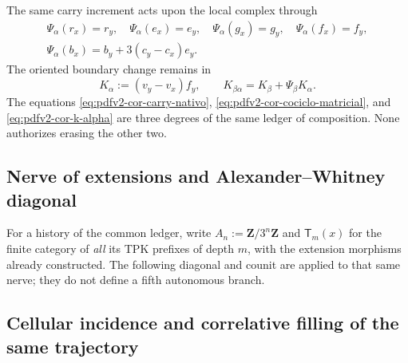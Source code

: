 The same carry increment acts upon the local complex through
\begin{equation}
\label{eq:pdfv2-cor-psi-generadores}
 \begin{gathered}
 \Psi_\alpha(r_x)=r_y,\quad
 \Psi_\alpha(e_x)=e_y,\quad
 \Psi_\alpha(g_x)=g_y,\quad
 \Psi_\alpha(f_x)=f_y,\\
 \Psi_\alpha(b_x)=b_y+3(c_y-c_x)e_y.
 \end{gathered}
\end{equation}
The oriented boundary change remains in
\begin{equation}
\label{eq:pdfv2-cor-k-alpha}
 K_\alpha:=(v_y-v_x)f_y,
 \qquad
 K_{\beta\alpha}=K_\beta+\Psi_\beta K_\alpha.
\end{equation}
The equations \eqref{eq:pdfv2-cor-carry-nativo},
\eqref{eq:pdfv2-cor-cociclo-matricial}, and
\eqref{eq:pdfv2-cor-k-alpha} are three degrees of the same ledger of composition.
None authorizes erasing the other two.

\subsection{Nerve of extensions and Alexander--Whitney diagonal}
For a history of the common ledger, write
\(A_n:=\mathbf Z/3^n\mathbf Z\) and \(\mathsf T_m(x)\) for the finite category
of \emph{all} its TPK prefixes of depth \(m\), with the
extension morphisms already constructed. The following diagonal and counit
are applied to that same nerve; they do not define a fifth autonomous branch.
\begingroup
  \let\section\subsection
  
\endgroup

\section{Cellular incidence and correlative filling of the same trajectory}


